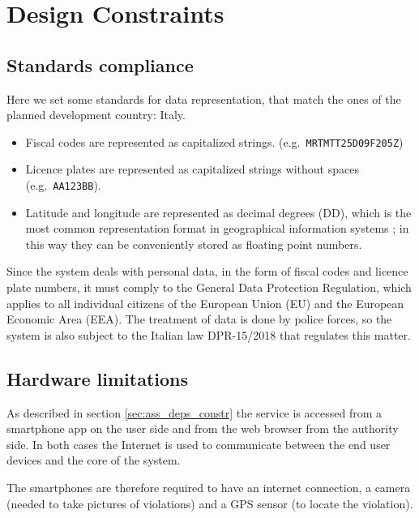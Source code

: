 \section{Design Constraints}

\subsection{Standards compliance}
Here we set some standards for data representation, that match the ones of the
planned development country: Italy.
\begin{itemize}
    \item Fiscal codes are represented as capitalized strings.
    (e.g.\ \texttt{MRTMTT25D09F205Z})
    \item Licence plates are represented as capitalized strings without spaces
    (e.g.\ \texttt{AA123BB}).
    \item Latitude and longitude are represented as decimal degrees (DD), which
    is the most common representation format in geographical information systems
    \cite{wiki:decimal-degrees}; in this way they can be conveniently stored as
    floating point numbers.
\end{itemize}

Since the system deals with personal data, in the form of fiscal codes and
licence plate numbers, it must comply to the General Data Protection Regulation,
which applies to all individual citizens of the European Union (EU) and the
European Economic Area (EEA).
The treatment of data is done by police forces, so the system is also subject to
the Italian law DPR-15/2018 \cite{gu:dpr-15/2018} that regulates this matter.

\subsection{Hardware limitations}
As described in section \ref{sec:ass_deps_constr} the service is accessed
from a smartphone app on the user side and from the web browser from the
authority side. In both cases the Internet is used to communicate between
the end user devices and the core of the system.

The smartphones are therefore required to have an internet connection, a
camera (needed to take pictures of violations) and a GPS sensor (to locate
the violation).
